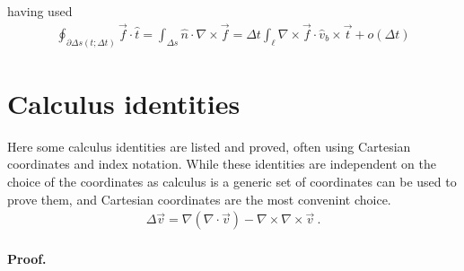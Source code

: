 \documentclass[letterpaper,10pt,english]{jupyterBook}
\begin{document}
\sphinxAtStartPar
having used
\begin{equation*}
\begin{split}\oint_{\partial \Delta s(t;\Delta t)} \vec{f} \cdot \hat{t} = \int_{\Delta s} \hat{n} \cdot \nabla \times \vec{f} = \Delta t \int_{\ell} \nabla \times \vec{f} \cdot \hat{v}_b \times \vec{t} + o(\Delta t)\end{split}
\end{equation*}
\sphinxstepscope


\chapter{Calculus identities}
\label{\detokenize{ch/tensor-algebra-calculus/calculus-identities:calculus-identities}}\label{\detokenize{ch/tensor-algebra-calculus/calculus-identities:tensor-calculus-identities}}\label{\detokenize{ch/tensor-algebra-calculus/calculus-identities::doc}}
\sphinxAtStartPar
Here some calculus identities are listed and proved, often using Cartesian coordinates and index notation. While these identities are independent on the choice of the coordinates \sphinxhyphen{} as calculus is \sphinxhyphen{} a generic set of coordinates can be used to prove them, and Cartesian coordinates are the most convenint choice.
\begin{equation}\label{equation:ch/tensor-algebra-calculus/calculus-identities:eq:identity:laplacian}
\begin{split}\Delta \vec{v} = \nabla (\nabla \cdot \vec{v}) - \nabla \times \nabla \times \vec{v} \ .\end{split}
\end{equation}\subsubsection*{Proof.}
\end{document}
